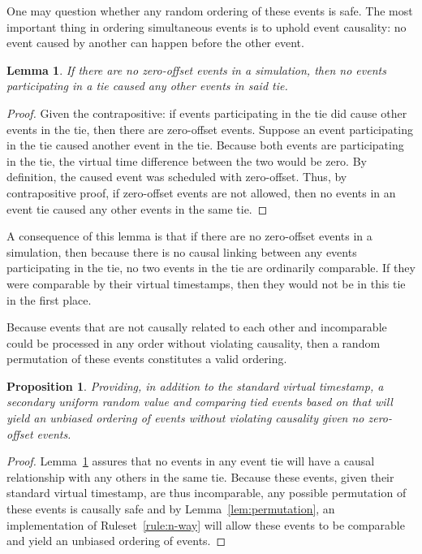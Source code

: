 \documentclass[nonacm,sigconf]{acmart}
\newtheorem{lemma}{Lemma}
\newtheorem{proposition}{Proposition}
\begin{document}
One may question whether any random ordering of these events is safe. The most important thing in ordering simultaneous events is to uphold event causality: no event caused by another can happen before the other event.

\begin{lemma}\label{lem:safe-causality}
  If there are no zero-offset events in a simulation, then no events participating in a tie caused any other events in said tie.
\end{lemma}
\begin{proof}
  Given the contrapositive: if events participating in the tie did cause other events in the tie, then there are zero-offset events. Suppose an event participating in the tie caused another event in the tie. Because both events are participating in the tie, the virtual time difference between the two would be zero. By definition, the caused event was scheduled with zero-offset.
  Thus, by contrapositive proof, if zero-offset events are not allowed, then no events in an event tie caused any other events in the same tie.
\end{proof}

A consequence of this lemma is that if there are no zero-offset events in a simulation, then because there is no causal linking between any events participating in the tie, no two events in the tie are ordinarily comparable. If they were comparable by their virtual timestamps, then they would not be in this tie in the first place.

Because events that are not causally related to each other and incomparable could be processed in any order without violating causality, then a random permutation of these events constitutes a valid ordering.


\begin{proposition}\label{prop:no-zero-unbiased}
  Providing, in addition to the standard virtual timestamp, a secondary uniform random value and comparing tied events based on that will yield an unbiased ordering of events without violating causality given no zero-offset events.
\end{proposition}
\begin{proof}
  Lemma~\ref{lem:safe-causality} assures that no events in any event tie will have a causal relationship with any others in the same tie. Because these events, given their standard virtual timestamp, are thus incomparable, any possible permutation of these events is causally safe and by Lemma~\ref{lem:permutation}, an implementation of Ruleset~\ref{rule:n-way} will allow these events to be comparable and yield an unbiased ordering of events.
\end{proof}
\end{document}
